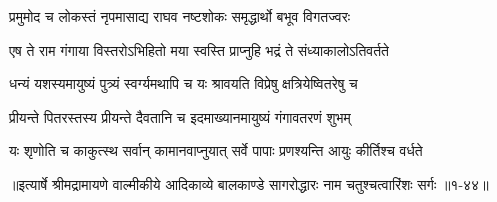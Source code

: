 \twolineshloka
{प्रमुमोद च लोकस्तं नृपमासाद्य राघव}
{नष्टशोकः समृद्धार्थो बभूव विगतज्वरः} %

\twolineshloka
{एष ते राम गंगाया विस्तरोऽभिहितो मया}
{स्वस्ति प्राप्नुहि भद्रं ते संध्याकालोऽतिवर्तते} %

\twolineshloka
{धन्यं यशस्यमायुष्यं पुत्र्यं स्वर्ग्यमथापि च}
{यः श्रावयति विप्रेषु क्षत्रियेष्वितरेषु च} %

\twolineshloka
{प्रीयन्ते पितरस्तस्य प्रीयन्ते दैवतानि च}
{इदमाख्यानमायुष्यं गंगावतरणं शुभम्} %

\twolineshloka
{यः शृणोति च काकुत्स्थ सर्वान् कामानवाप्नुयात्}
{सर्वे पापाः प्रणश्यन्ति आयुः कीर्तिश्च वर्धते} %


॥इत्यार्षे श्रीमद्रामायणे वाल्मीकीये आदिकाव्ये बालकाण्डे सागरोद्धारः नाम चतुश्चत्वारिंशः सर्गः ॥१-४४॥
